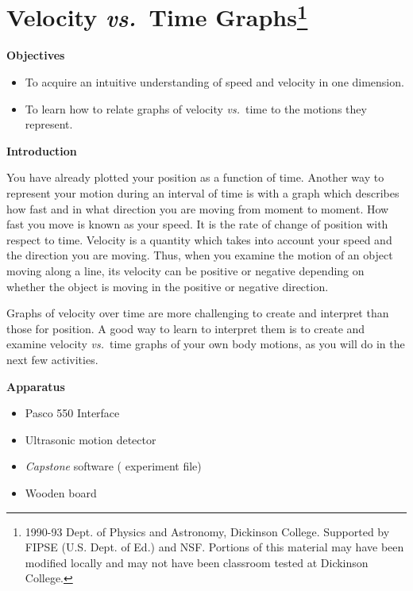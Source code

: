 
\section{Velocity \textit{vs.}~Time Graphs\footnote{
1990-93 Dept. of Physics and Astronomy, Dickinson College. Supported by FIPSE
(U.S. Dept. of Ed.) and NSF. Portions of this material may have been modified
locally and may not have been classroom tested at Dickinson College.
}}

\makelabheader %

\textbf{Objectives }

\begin{itemize}
\item To acquire an intuitive understanding of speed and velocity in one dimension. 
\item To learn how to relate graphs of velocity \textit{vs.}~time to the motions they represent.
\end{itemize}
\textbf{Introduction} 

You have already plotted your position as a function of time. Another way to
represent your motion during an interval of time is with a graph which describes
how fast and in what direction you are moving from moment to moment. How fast
you move is known as your speed. It is the rate of change of position with respect
to time. Velocity is a quantity which takes into account your speed and the
direction you are moving. Thus, when you examine the motion of an object moving
along a line, its velocity can be positive or negative depending
on whether the object is moving in the positive or negative direction.

Graphs of velocity over time are more challenging to create and interpret than
those for position. A good way to learn to interpret them is to create and examine velocity \textit{vs.}~time graphs of your own body motions, as you will do in the next few activities.

\medskip
\textbf{Apparatus}

\begin{itemize}
\item Pasco 550 Interface
\item Ultrasonic motion detector
\item \textit{Capstone} software ( experiment file)
\item Wooden board
\end{itemize}

